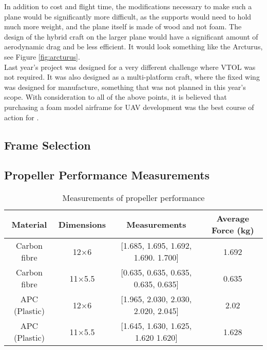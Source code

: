 In addition to cost and flight time, the modifications necessary to make such a plane would be significantly more difficult, as the supports would need to hold much more weight, and the plane itself is made of wood and not foam. The design of the hybrid craft on the larger plane would have a significant amount of aerodynamic drag and be less efficient. It would look something like the Arcturus, see Figure \ref{fig:arcturus}.\\
	
Last year's project was designed for a very different challenge where VTOL was not required. It was also designed as a multi-platform craft, where the fixed wing was designed for manufacture, something that was not planned in this year's scope. With consideration to all of the above points, it is believed that purchasing a foam model airframe for UAV development was the best course of action for \ID.

\subsection{Frame Selection}
\label{sec:selection}

\subsection{Propeller Performance Measurements}
\label{sec:proptest}
\begin{table}[!htbp]
	\centering
	\caption{Measurements of propeller performance}
	\begin{tabular}{|c|c|c|c|}
		\hline Material & Dimensions & Measurements & Average Force (kg) \\ 
		\hline Carbon fibre & 12$\times$6 & [1.685, 1.695, 1.692, 1.690. 1.700] & 1.692 \\ 
		\hline Carbon fibre & 11$\times$5.5 & [0.635, 0.635, 0.635, 0.635, 0.635] & 0.635 \\ 
		\hline APC (Plastic) & 12$\times$6 & [1.965, 2.030, 2.030, 2.020, 2.045] & 2.02 \\ 
		\hline APC (Plastic) & 11$\times$5.5 & [1.645, 1.630, 1.625, 1.620 1.620] & 1.628 \\ 
		\hline 
	\end{tabular} 
	\label{tab:props}
\end{table}

